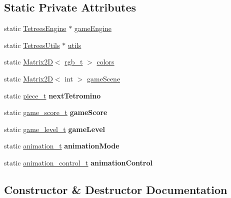 \subsection*{Static Private Attributes}
\begin{DoxyCompactItemize}
\item 
static \mbox{\hyperlink{classTetreesEngine}{Tetrees\+Engine}} $\ast$ \mbox{\hyperlink{classTetreesUI_a07faa56ea40b28beba7509fa7f65c897}{game\+Engine}}
\item 
static \mbox{\hyperlink{classTetreesUtils}{Tetrees\+Utils}} $\ast$ \mbox{\hyperlink{classTetreesUI_a80545840b2848938d01d7f85786ee141}{utils}}
\item 
static \mbox{\hyperlink{classMatrix2D}{Matrix2D}}$<$ \mbox{\hyperlink{structrgb__t}{rgb\+\_\+t}} $>$ \mbox{\hyperlink{classTetreesUI_a57300c1925cb5ae34c9220cd993e28b2}{colors}}
\item 
static \mbox{\hyperlink{classMatrix2D}{Matrix2D}}$<$ int $>$ \mbox{\hyperlink{classTetreesUI_a604cf4cecdbc93745eaf7733b3c33602}{game\+Scene}}
\item 
\mbox{\label{classTetreesUI_a6296ce8f3cde853cec110718c4b88540}} 
static \mbox{\hyperlink{structpiece__t}{piece\+\_\+t}} {\bfseries next\+Tetromino}
\item 
\mbox{\label{classTetreesUI_a128491041c6b77acec829fb5b1f4dafb}} 
static \mbox{\hyperlink{structgame__score__t}{game\+\_\+score\+\_\+t}} {\bfseries game\+Score}
\item 
\mbox{\label{classTetreesUI_a700b75dbee9c324c69a18f34c5efdab9}} 
static \mbox{\hyperlink{structgame__level__t}{game\+\_\+level\+\_\+t}} {\bfseries game\+Level}
\item 
\mbox{\label{classTetreesUI_af3bd9b55da30d2b324c2dfe2d740d8a2}} 
static \mbox{\hyperlink{TetreesDefs_8hpp_a10487f3bfa31fd7b7b8c20f403f8c947}{animation\+\_\+t}} {\bfseries animation\+Mode}
\item 
\mbox{\label{classTetreesUI_a06df6e44abd5d521448cf1299433b55c}} 
static \mbox{\hyperlink{structanimation__control__t}{animation\+\_\+control\+\_\+t}} {\bfseries animation\+Control}
\end{DoxyCompactItemize}


\subsection{Constructor \& Destructor Documentation}
\mbox{\label{classTetreesUI_ad6a5b91b1574c25c2bcd48601142013c}} 
